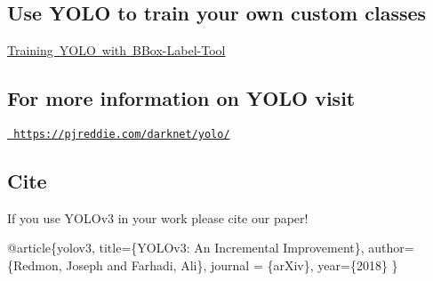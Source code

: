 \subsection*{Use Y\+O\+LO to train your own custom classes}

\mbox{\hyperlink{md_yoloTraining}{Training Y\+O\+LO with B\+Box-\/\+Label-\/\+Tool}}

\subsection*{For more information on Y\+O\+LO visit}

\href{https://pjreddie.com/darknet/yolo/}{\texttt{ https\+://pjreddie.\+com/darknet/yolo/}}

\subsection*{Cite}

If you use Y\+O\+L\+Ov3 in your work please cite our paper!

@article\{yolov3, title=\{Y\+O\+L\+Ov3\+: An Incremental Improvement\}, author=\{Redmon, Joseph and Farhadi, Ali\}, journal = \{ar\+Xiv\}, year=\{2018\} \} 